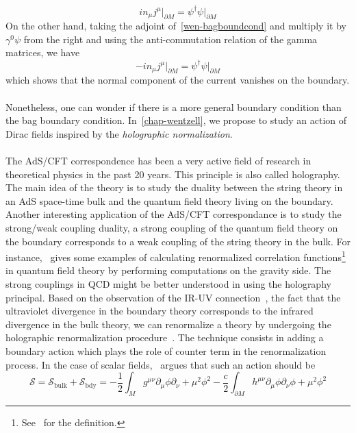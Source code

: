 \begin{equation*}
i n_\mu j^\mu \big\vert_{\partial M}= \psi^\dagger\psi \big\vert_{\partial M}
\end{equation*}
On the other hand, taking the adjoint of~\cref{wen-bagboundcond} and multiply it by $\gamma^0\psi$ from the right and using the anti-commutation relation of the gamma matrices, we have
\begin{equation*}
- i n_\mu j^\mu \big\vert_{\partial M} = \psi^\dagger\psi\big\vert_{\partial M}
\end{equation*}
which shows that the normal component of the current vanishes on the boundary. \\\\
Nonetheless, one can wonder if there is a more general boundary condition than the bag boundary condition. 
In~\cref{chap-wentzell}, we propose to study an action of Dirac fields inspired by the \textit{holographic normalization}. \\\\
%
The AdS/CFT correspondence has been a very active field of research in theoretical physics in the past 20 years. 
This principle is also called holography.
The main idea of the theory is to study the duality between the string theory in an AdS space-time bulk and the quantum field theory living on the boundary.
Another interesting application of the AdS/CFT correspondance is to study the strong/weak coupling duality, \ie
a strong coupling of the quantum field theory on the boundary corresponds to a weak coupling of the string theory in the bulk. 
For instance,~\cite{Skenderis2002} gives some examples of calculating renormalized correlation functions\footnote{
See~\eg\cite{Peskin1995} for the definition.
} in quantum field theory by performing computations on the gravity side.
The strong couplings in QCD might be better understood in using the holography principal. 
Based on the observation of the IR-UV connection~\cite{Susskind1998}, 
\ie the fact that the ultraviolet divergence in the boundary theory corresponds to the infrared divergence in the bulk theory, 
we can renormalize a theory by undergoing the holographic renormalization procedure~\cite{Skenderis2002}. 
The technique consists in adding a boundary action which plays the role of counter term in the renormalization process.
In the case of scalar fields,~\cite{Skenderis2002} argues that such an action should be
\begin{equation*}
\mathcal{S} = \mathcal{S}_{\mathrm{bulk}} + \mathcal{S}_{\mathrm{bdy}} = 
-\frac 1 2 \int_M g^{\mu\nu} \partial_\mu \phi \partial_{\nu} + 
\mu^2\phi^2 - \frac c 2 \int_{\partial M}h^{\mu\nu}\partial_\mu\phi\partial_\nu\phi + \mu^2\phi^2
\end{equation*}
